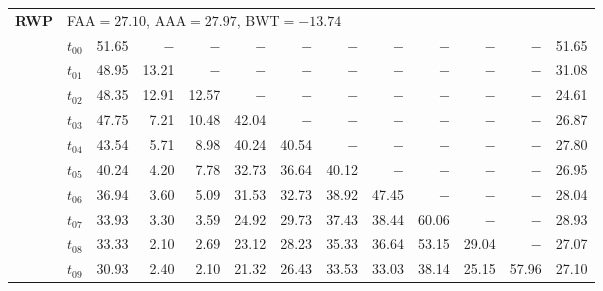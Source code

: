 \begin{table}[ht]
\begin{tabular}{@{}l l r r r r r r r r r r r@{}}
\midrule
\multirow{11}{*}{\textbf{RWP}} & \multicolumn{12}{l}{\quad\small FAA$=27.10$,\; AAA$=27.97$,\; BWT$=-13.74$} \\
 & $t_{00}$ & 51.65 & $-$ & $-$ & $-$ & $-$ & $-$ & $-$ & $-$ & $-$ & $-$ & 51.65 \\
 & $t_{01}$ & 48.95 & 13.21 & $-$ & $-$ & $-$ & $-$ & $-$ & $-$ & $-$ & $-$ & 31.08 \\
 & $t_{02}$ & 48.35 & 12.91 & 12.57 & $-$ & $-$ & $-$ & $-$ & $-$ & $-$ & $-$ & 24.61 \\
 & $t_{03}$ & 47.75 & 7.21 & 10.48 & 42.04 & $-$ & $-$ & $-$ & $-$ & $-$ & $-$ & 26.87 \\
 & $t_{04}$ & 43.54 & 5.71 & 8.98 & 40.24 & 40.54 & $-$ & $-$ & $-$ & $-$ & $-$ & 27.80 \\
 & $t_{05}$ & 40.24 & 4.20 & 7.78 & 32.73 & 36.64 & 40.12 & $-$ & $-$ & $-$ & $-$ & 26.95 \\
 & $t_{06}$ & 36.94 & 3.60 & 5.09 & 31.53 & 32.73 & 38.92 & 47.45 & $-$ & $-$ & $-$ & 28.04 \\
 & $t_{07}$ & 33.93 & 3.30 & 3.59 & 24.92 & 29.73 & 37.43 & 38.44 & 60.06 & $-$ & $-$ & 28.93 \\
 & $t_{08}$ & 33.33 & 2.10 & 2.69 & 23.12 & 28.23 & 35.33 & 36.64 & 53.15 & 29.04 & $-$ & 27.07 \\
 & $t_{09}$ & 30.93 & 2.40 & 2.10 & 21.32 & 26.43 & 33.53 & 33.03 & 38.14 & 25.15 & 57.96 & 27.10 \\
\bottomrule
\end{tabular}
\end{table}

